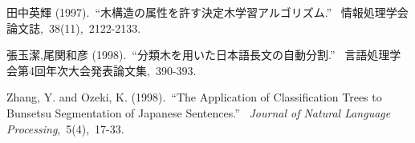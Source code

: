 \begin{list}{}{}
\item[田中英輝](1997).\ “木構造の属性を許す決定木学習アルゴリズム.”
\ 情報処理学会論文誌,\ 38(11),\ 2122-2133.


\item[張玉潔,尾関和彦](1998).\ “分類木を用いた日本語長文の自動分割.”
\  言語処理学会第4回年次大会発表論文集,\ 390-393. 

\item[Zhang, Y. and Ozeki, K.](1998).\ “The Application of
Classification Trees to Bunsetsu Segmentation of Japanese Sentences.” 
\ {\it Journal of Natural Language Processing},\ 5(4),\ 17-33.
\end{list}


